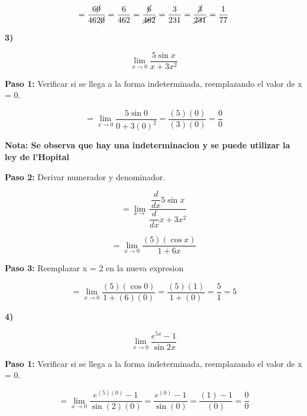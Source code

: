 \documentclass[12pt,a4paper]{article}
\begin{document}
\[
= \frac{6\cancel{0}}{462\cancel{0}}= \frac{6}{462}= \frac{\cancel{6}}{\cancel{462}}= \frac{3}{231}= \frac{\cancel{3}}{\cancel{231}} = \frac{1}{77}
\]

\vspace{0.2cm}
\newpage

\textbf{3)}

\[
\lim_{x \to 0} \frac{5\sin x}{x + 3x^2} 
\]

\vspace{0.2cm}

\textbf{Paso 1:}
\vspace{0.2cm}
Verificar si se llega a la forma indeterminada, reemplazando el valor de x = 0.

\[
= \lim_{x \to 0} \frac{5\sin 0}{0 + 3(0)^2}= \frac{(5)(0)}{(3)(0)}= \frac{0}{0}
\]


\vspace{0.2cm}

\textbf{Nota: Se observa que hay una indeterminacion y se puede utilizar la ley de l'Hopital }

\vspace{0.5cm}

\textbf{Paso 2:}
\vspace{0.2cm}
Derivar numerador y denominador.

\[
= \lim_{x \to } \frac{\dfrac{d}{dx} 5 \sin x}{\dfrac{d}{dx} x+3x^2}
\]

\[
= \lim_{x \to 0} \frac{(5)(\cos x)}{1+6x}
\]

\vspace{0.2cm}



\textbf{Paso 3:}
\vspace{0.2cm}
Reemplazar x = 2 en la nueva expresion

\[
= \lim_{x \to 0} \frac{(5)(\cos 0)}{1+(6)(0)}= \frac{(5)(1)}{1+(0)}= \frac{5}{1}= 5
\]


\newpage

\textbf{4)}

\[
\lim_{x \to 0} \frac{e^{5x} -1}{\sin 2x} 
\]


\vspace{0.2cm}

\textbf{Paso 1:}
\vspace{0.2cm}
Verificar si se llega a la forma indeterminada, reemplazando el valor de x = 0.

\[
= \lim_{x \to 0} \frac{e^{(5)(0)} -1}{\sin (2)(0)}=  \frac{e^{(0)} -1}{\sin (0)} =  \frac{(1) -1}{(0)} = \frac{0}{0}
\]
\end{document}

